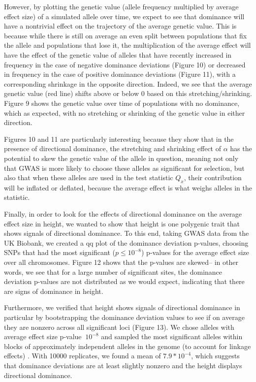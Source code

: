 \documentclass[a4paper,12pt]{article}
\begin{document}
However, by plotting the genetic value (allele frequency multiplied by
average effect size) of a simulated allele over time, we expect to see
that dominance will have a nontrivial effect on the trajectory of the
average genetic value. This is because while there is still on average
an even split between populations that fix the allele and populations
that lose it, the multiplication of the average effect will have the
effect of  the genetic value of alleles that have
recently increased in frequency in the case of negative dominance
deviations (Figure 10) or decreased in frequency in the case of
positive dominance deviations (Figure 11), with a corresponding
shrinkage in the opposite direction. Indeed, we see that the
average genetic value (red line) shifts above or below 0 based on this
stretching/shrinking. Figure 9 shows the genetic value
over time of populations with no dominance, which as expected, with no
stretching or shrinking of the genetic value in either direction.

Figures 10 and 11 are particularly interesting because they show that in
the presence of directional dominance, the stretching and shrinking
effect of $\alpha$ has the potential to skew the genetic value of the
allele in question, meaning not only that GWAS is more likely to
choose these alleles as significant for selection, but also that when
these alleles are used in the test statistic $Q_x$, their contribution
will be inflated or deflated, because the average effect is what
weighs alleles in the statistic.

Finally, in order to look for the effects of directional dominance on
the average effect size in height, we wanted to show that height is one
polygenic trait that shows signals of directional dominance. To this
end, taking GWAS data from the UK Biobank, we created a qq plot of the
dominance deviation p-values, choosing SNPs that had the 
most significant ($p \leq 10^{-8}$) p-values for the average effect size
over all chromosomes. Figure 12 shows that the p-values are skewed--
in other words, we see that for a large number of significant sites,
the dominance deviation p-values are not distributed as we would
expect, indicating that there are signs of dominance in height.

Furthermore, we verified that height shows signals of directional
dominance in particular by bootstrapping the dominance deviation
values to see if on average they are nonzero across all
significant loci (Figure 13). We chose alleles with average effect size p-value
$\ 10^{-8}$ and sampled the most significant alleles within
blocks of approximately independent alleles in the genome (to account
for linkage effects) \cite{joesblocks}. With 10000 replicates, we found a mean of
$7.9*10^{-4}$, which suggests that dominance deviations are at least
slightly nonzero and the height displays directional dominance.  
\end{document}
